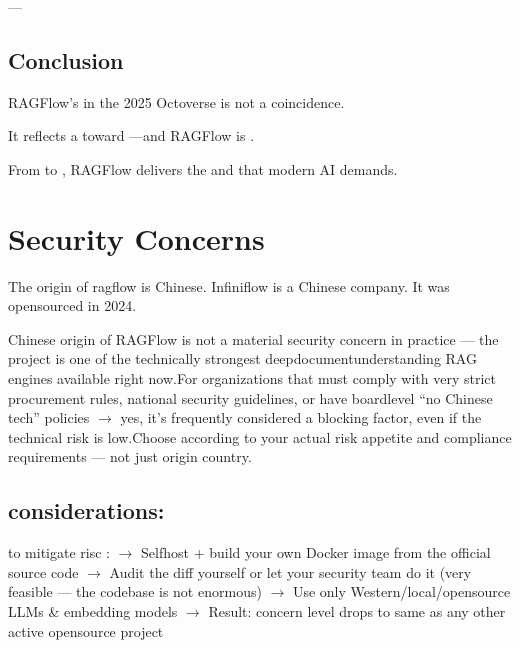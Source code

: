 \documentclass[letterpaper,10pt,english]{sphinxmanual}
\begin{document}
\sphinxAtStartPar
—


\section{Conclusion}
\label{\detokenize{about:conclusion}}
\sphinxAtStartPar
RAGFlow’s  in the 2025 Octoverse is not a coincidence.

\sphinxAtStartPar
It reflects a  toward —and RAGFlow is .

\sphinxAtStartPar
From  to , RAGFlow delivers the  and  that modern AI demands.

\sphinxAtStartPar
{}

\sphinxstepscope


\chapter{Security Concerns}
\label{\detokenize{security-concerns:security-concerns}}\label{\detokenize{security-concerns::doc}}
\sphinxAtStartPar
The origin of ragflow is Chinese. Infiniflow is a Chinese company.
It was open\sphinxhyphen{}sourced in 2024.

\sphinxAtStartPar
Chinese origin of RAGFlow is not a material security concern in practice — the project is one of the technically strongest deep\sphinxhyphen{}document\sphinxhyphen{}understanding RAG engines available right now.For organizations that must comply with very strict procurement rules, national security guidelines, or have board\sphinxhyphen{}level “no Chinese tech” policies \(\rightarrow\) yes, it’s frequently considered a blocking factor, even if the technical risk is low.Choose according to your actual risk appetite and compliance requirements — not just origin country.


\section{considerations:}
\label{\detokenize{security-concerns:considerations}}
\sphinxAtStartPar
to mitigate risc :
\(\rightarrow\) Self\sphinxhyphen{}host + build your own Docker image from the official source code
\(\rightarrow\) Audit the diff yourself or let your security team do it (very feasible — the codebase is not enormous)
\(\rightarrow\) Use only Western/local/open\sphinxhyphen{}source LLMs \& embedding models
\(\rightarrow\) Result: concern level drops to same as any other active open\sphinxhyphen{}source project
\end{document}
